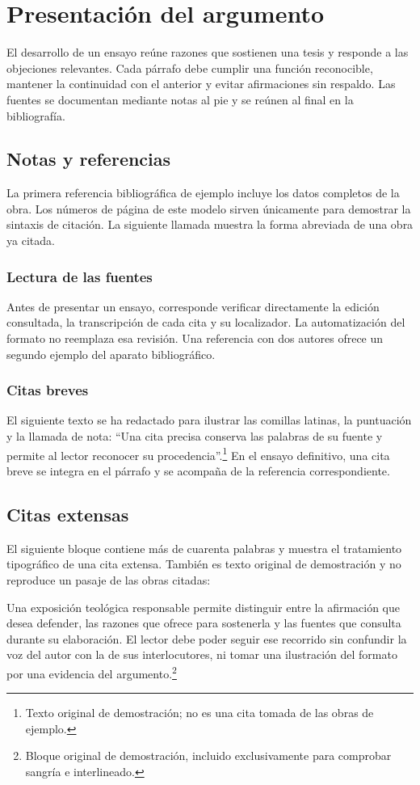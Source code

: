 \section{Presentación del argumento}
El desarrollo de un ensayo reúne razones que sostienen una tesis y responde a las objeciones relevantes.
Cada párrafo debe cumplir una función reconocible, mantener la continuidad con el anterior y evitar afirmaciones sin respaldo.
Las fuentes se documentan mediante notas al pie y se reúnen al final en la bibliografía.

\subsection{Notas y referencias}
La primera referencia bibliográfica de ejemplo incluye los datos completos de la obra.
Los números de página de este modelo sirven únicamente para demostrar la sintaxis de citación.\autocite[202]{donner2020}
La siguiente llamada muestra la forma abreviada de una obra ya citada.\autocite[293]{donner2020}

\subsubsection{Lectura de las fuentes}
Antes de presentar un ensayo, corresponde verificar directamente la edición consultada, la transcripción de cada cita y su localizador.
La automatización del formato no reemplaza esa revisión.
Una referencia con dos autores ofrece un segundo ejemplo del aparato bibliográfico.\autocite[16]{sendek2007}

\subsubsection{Citas breves}
El siguiente texto se ha redactado para ilustrar las comillas latinas, la puntuación y la llamada de nota: \enquote{Una cita precisa conserva las palabras de su fuente y permite al lector reconocer su procedencia}.\footnote{Texto original de demostración; no es una cita tomada de las obras de ejemplo.}
En el ensayo definitivo, una cita breve se integra en el párrafo y se acompaña de la referencia correspondiente.

\subsection{Citas extensas}
El siguiente bloque contiene más de cuarenta palabras y muestra el tratamiento tipográfico de una cita extensa.
También es texto original de demostración y no reproduce un pasaje de las obras citadas:
\begin{SRLblockquote}
Una exposición teológica responsable permite distinguir entre la afirmación que desea defender, las razones que ofrece para sostenerla y las fuentes que consulta durante su elaboración.
El lector debe poder seguir ese recorrido sin confundir la voz del autor con la de sus interlocutores, ni tomar una ilustración del formato por una evidencia del argumento.\footnote{Bloque original de demostración, incluido exclusivamente para comprobar sangría e interlineado.}
\end{SRLblockquote}

